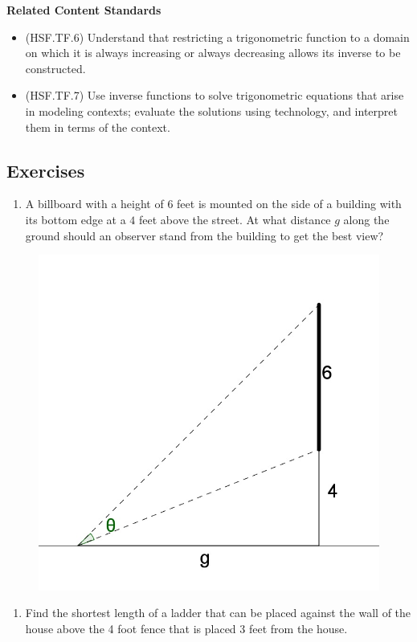 \documentclass[
]{book}
\providecommand{\tightlist}{%
  \setlength{\itemsep}{0pt}\setlength{\parskip}{0pt}}
\newenvironment{standards}{}{}
\theoremstyle{definition}
\theoremstyle{definition}
\theoremstyle{definition}
\theoremstyle{definition}
\theoremstyle{remark}
\begin{document}
\begin{standards}

\begin{center}
\textbf{Related Content Standards}

\end{center}

\begin{itemize}
\tightlist
\item
  (HSF.TF.6) Understand that restricting a trigonometric function to a domain on which it is always increasing or always decreasing allows its inverse to be constructed.
\item
  (HSF.TF.7) Use inverse functions to solve trigonometric equations that arise in modeling contexts; evaluate the solutions using technology, and interpret them in terms of the context.
\end{itemize}

\end{standards}

\hypertarget{exercises-35}{%
\subsection{Exercises}\label{exercises-35}}

\begin{enumerate}
\def\labelenumi{\arabic{enumi}.}
\tightlist
\item
  A billboard with a height of \(6\) feet is mounted on the side of a building with its bottom edge at a \(4\) feet above the street. At what distance \(g\) along the ground should an observer stand from the building to get the best view?
\end{enumerate}

\begin{figure}

{\centering \includegraphics[width=0.3\linewidth]{images/billboard} 

}

\end{figure}

\begin{enumerate}
\def\labelenumi{\arabic{enumi}.}
\setcounter{enumi}{1}
\tightlist
\item
  Find the shortest length of a ladder that can be placed against the wall of the house above the 4 foot fence that is placed 3 feet from the house.
\end{enumerate}
\end{document}

